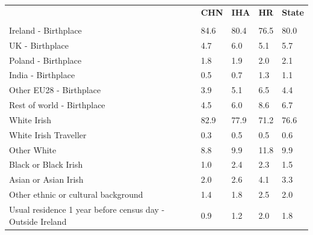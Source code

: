 \documentclass{article}
\begin{document}
\pagebreak
\begin{table}[h]	
\centering
		\begin{tabular}{KTTTT}
  \hline
& \textbf{CHN} & \textbf{IHA} & \textbf{HR}& \textbf{State}\\ 
  \hline
    \\ 
    \hline
Ireland - Birthplace & 84.6& 80.4& 76.5& 80.0\\
UK - Birthplace & 4.7& 6.0& 5.1& 5.7\\
Poland - Birthplace & 1.8& 1.9& 2.0& 2.1\\
India - Birthplace & 0.5& 0.7& 1.3& 1.1\\
Other EU28 - Birthplace & 3.9& 5.1& 6.5& 4.4\\
Rest of world - Birthplace & 4.5& 6.0& 8.6& 6.7\\
    \hline
White Irish & 82.9& 77.9& 71.2& 76.6\\
White Irish Traveller & 0.3& 0.5& 0.5& 0.6\\
Other White &  8.8&  9.9& 11.8&  9.9\\
Black or Black Irish & 1.0& 2.4& 2.3& 1.5\\
Asian or Asian Irish & 2.0& 2.6& 4.1& 3.3\\
Other ethnic or cultural background & 1.4& 1.8& 2.5& 2.0\\
    \hline
Usual residence 1 year before census day - Outside Ireland & 0.9& 1.2& 2.0& 1.8\\


\end{tabular}
\end{table}
\end{document}

